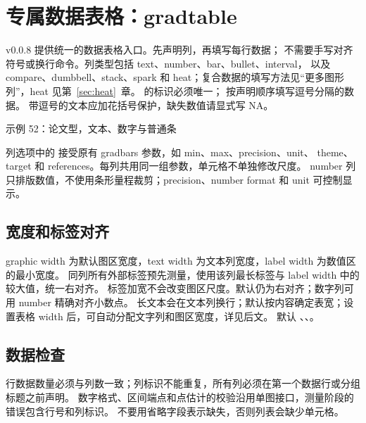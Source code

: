 \section{专属数据表格：gradtable}
v0.0.8 提供统一的数据表格入口。先声明列，再填写每行数据；
不需要手写对齐符号或换行命令。列类型包括 text、number、bar、bullet、interval，
以及 compare、dumbbell、stack、spark 和 heat；复合数据的填写方法见“更多图形列”，heat 见第~\ref{sec:heat}~章。
 的标识必须唯一；
 按声明顺序填写逗号分隔的数据。
带逗号的文本应加花括号保护，缺失数值请显式写 NA。

\begin{example}[text and listing,sidebyside=false]{示例 52：论文型，文本、数字与普通条}
\begin{center}
\begin{gradtable}[align=c,header align=c,preset=paper,graphic width=48mm,
  text width=24mm,label width=14mm]
\end{gradtable}
\end{center}
\end{example}
列选项中的  接受原有 gradbars 参数，如 min、max、precision、unit、
theme、target 和 references。每列共用同一组参数，单元格不单独修改尺度。
number 列只排版数值，不使用条形量程裁剪；precision、number format 和 unit 可控制显示。

\subsection{宽度和标签对齐}
graphic width 为默认图区宽度，text width 为文本列宽度，label width 为数值区的最小宽度。
同列所有外部标签预先测量，使用该列最长标签与 label width 中的较大值，统一右对齐。
标签加宽不会改变图区尺度。默认仍为右对齐；数字列可用 number  精确对齐小数点。
长文本会在文本列换行；默认按内容确定表宽；设置表格 width 后，可自动分配文字列和图区宽度，详见后文。
默认 、、。

\subsection{数据检查}
行数据数量必须与列数一致；列标识不能重复，所有列必须在第一个数据行或分组标题之前声明。
数字格式、区间端点和点估计的校验沿用单图接口，测量阶段的错误包含行号和列标识。
不要用省略字段表示缺失，否则列表会缺少单元格。
